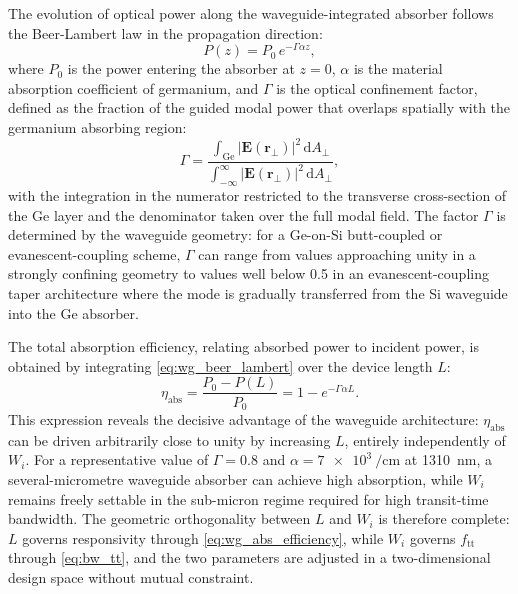 The evolution of optical power along the waveguide-integrated absorber follows
the Beer-Lambert law in the propagation direction:
\begin{equation}
    P(z) = P_0\,e^{-\Gamma\alpha z},
    \label{eq:wg_beer_lambert}
\end{equation}
where $P_0$ is the power entering the absorber at $z=0$, $\alpha$ is the
material absorption coefficient of germanium, and $\Gamma$ is the optical
confinement factor, defined as the fraction of the guided modal power that
overlaps spatially with the germanium absorbing region:
\begin{equation}
    \Gamma = \frac{\displaystyle\int_{\mathrm{Ge}}
        |\mathbf{E}(\mathbf{r}_\perp)|^2\,\mathrm{d}A_\perp}
    {\displaystyle\int_{-\infty}^{\infty}
        |\mathbf{E}(\mathbf{r}_\perp)|^2\,\mathrm{d}A_\perp},
    \label{eq:mode_overlap}
\end{equation}
with the integration in the numerator restricted to the transverse cross-section
of the Ge layer and the denominator taken over the full modal field. The
factor $\Gamma$ is determined by the waveguide geometry: for a Ge-on-Si
butt-coupled or evanescent-coupling scheme, $\Gamma$ can range from values
approaching unity in a strongly confining geometry to values well below
0.5 in an evanescent-coupling taper architecture where the mode is
gradually transferred from the Si waveguide into the Ge absorber.

The total absorption efficiency, relating absorbed power to incident power,
is obtained by integrating \cref{eq:wg_beer_lambert} over the device length $L$:
\begin{equation}
    \eta_{\mathrm{abs}} = \frac{P_0 - P(L)}{P_0} = 1 - e^{-\Gamma\alpha L}.
    \label{eq:wg_abs_efficiency}
\end{equation}
This expression reveals the decisive advantage of the waveguide architecture:
$\eta_{\mathrm{abs}}$ can be driven arbitrarily close to unity by increasing
$L$, entirely independently of $W_i$. For a representative value of
$\Gamma = 0.8$ and $\alpha = \SI{7e3}{\per\centi\metre}$ at
\SI{1310}{\nano\metre}, a several-micrometre waveguide absorber can achieve
high absorption, while $W_i$ remains freely
settable in the sub-micron regime required for high transit-time bandwidth.
The geometric orthogonality between $L$ and $W_i$ is therefore complete:
$L$ governs responsivity through \cref{eq:wg_abs_efficiency}, while $W_i$
governs $f_{\mathrm{tt}}$ through \cref{eq:bw_tt}, and the two parameters
are adjusted in a two-dimensional design space without mutual constraint.

